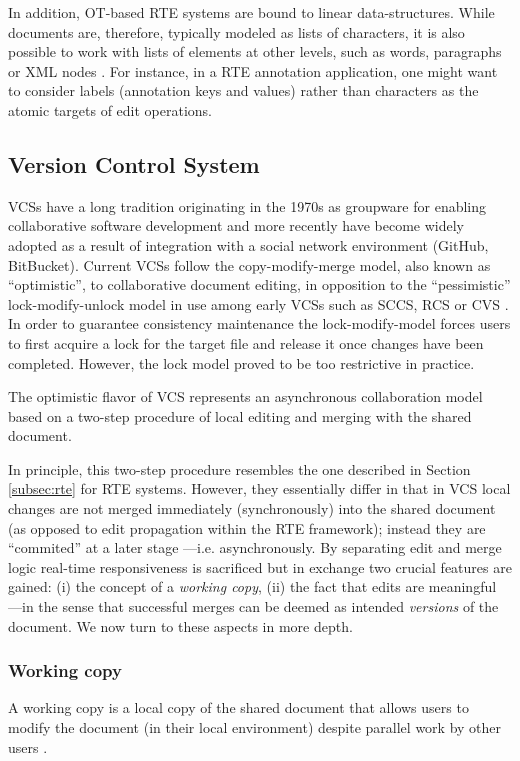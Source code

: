 \documentclass{sig-alternate}
\begin{document}
In addition, OT-based RTE systems are bound to linear data-structures. While documents are, therefore,
typically modeled as lists of characters, it is also possible to work with lists of elements at other
levels, such as words, paragraphs or XML nodes \cite{Imine2009,SuClarence}. For instance, in a RTE
annotation application, one might want to consider labels (annotation keys and values) rather than
characters as the atomic targets of edit operations.


\subsection{Version Control System}\label{subsec:vcs}

VCSs have a long tradition originating in the 1970s as groupware for enabling collaborative
software development and more recently have become widely adopted as a result of
integration with a social network environment (GitHub, BitBucket).
Current VCSs follow the copy-modify-merge model, also known as ``optimistic'', to
collaborative document editing, in opposition to the ``pessimistic'' lock-modify-unlock model
in use among early VCSs such as SCCS, RCS or CVS \cite{Loeliger2012}.
In order to guarantee consistency maintenance the lock-modify-model forces users to first
acquire a lock for the target file and release it once changes have been completed. However, 
the lock model proved to be too restrictive in practice.

The optimistic flavor of VCS represents an asynchronous collaboration model based on a
two-step procedure of local editing and merging with the shared document.

In principle, this two-step procedure resembles the one described in Section \ref{subsec:rte}
for RTE systems. However, they essentially differ in that in VCS local changes are not merged
immediately (synchronously) into the shared document (as opposed to edit propagation
within the RTE framework); instead they are ``commited'' at a later stage ---i.e. asynchronously.
By separating edit and merge logic real-time responsiveness is
sacrificed but in exchange two crucial features are gained: (i) the concept of a
\textit{working copy}, (ii) the fact that edits are meaningful ---in the sense
that successful merges can be deemed as intended \textit{versions} of the document.
We now turn to these aspects in more depth.

\subsubsection{Working copy}\label{subsec:workingcopy}
A working copy is a local copy of the shared document that allows users
to modify the document (in their local environment) despite parallel work by other users
\cite{Collins-Sussman}.
\end{document}
